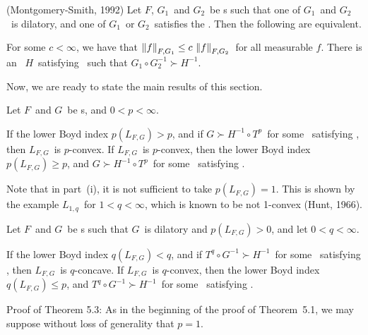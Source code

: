 \begin{thm} (Montgomery-Smith, 1992) Let $F$, $G_1$\ and $G_2$\ be
\phifunction s such that one of $G_1$\ and $G_2$\ is dilatory, and one of 
$G_1$\
or $G_2$\ satisfies the \Deltacond. Then the following are equivalent.
\begin{itemrom}
\itemi For some $c<\infty$, we have that 
$\left\| f \right\|_{F,G_1} \le c\, \left\| f \right\|_{F,G_2}$\ for all measurable $f$.
\itemii There is an \Nfunction\ $H$\ satisfying \conditionJ\ such that 
$G_1\circ
G_2^{-1} \succ H^{-1}$. 
\end{itemrom}
\end{thm}

Now, we are ready to state the main results of this section.

\begin{thm} Let $F$\ and $G$\ be \phifunction s, and $0<p<\infty$.
\begin{itemrom}
\itemi If the lower Boyd index
$p(L_{F,G}) > p$, and if $G\succ H^{-1}\circ T^p$\ for some \Nfunction\
satisfying \conditionJ, then $L_{F,G}$\ is $p$-convex.
\itemii If $L_{F,G}$\ is $p$-convex, then the lower Boyd index
$p(L_{F,G}) \ge p$, and $G\succ H^{-1}\circ T^p$\ for some \Nfunction\ 
satisfying
\conditionJ.
\end{itemrom}
\end{thm}

Note that in part~(i), it is not sufficient to take $p(L_{F,G}) = 1$. This is
shown by the example $L_{1,q}$\ for $1<q<\infty$, which is known to be not
1-convex (Hunt, 1966).

\begin{thm} Let $F$\ and $G$\ be \phifunction s such that $G$\ is
dilatory and $p(L_{F,G}) > 0$, and let $0<q<\infty$.
\begin{itemrom}
\itemi If the lower Boyd index
$q(L_{F,G}) < q$, and if $T^q \circ G^{-1} \succ H^{-1}$\ for some
\Nfunction\ satisfying \conditionJ, then $L_{F,G}$\ is $q$-concave.
\itemii If $L_{F,G}$\ is $q$-convex, then the lower Boyd index
$q(L_{F,G}) \le p$, and $T^q \circ G^{-1} \succ H^{-1}$\ for some \Nfunction\
satisfying \conditionJ.
\end{itemrom}
\end{thm}

\noindent Proof of Theorem 5.3: As in the beginning of the proof of 
Theorem~5.1, we may
suppose without loss of generality that $p=1$.

